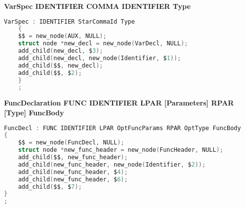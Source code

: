 \documentclass[12pt]{article}
\begin{document}
\begin{itemize}
\begin{center}
                \end{center}
            \begin{center}
                \small\textbf{VarSpec \textendash{} IDENTIFIER {COMMA IDENTIFIER} Type}
            \end{center}
            \begin{center}
                \begin{lstlisting}[language=C, basicstyle=\small\ttfamily]
VarSpec : IDENTIFIER StarCommaId Type
    {
    $$ = new_node(AUX, NULL);
    struct node *new_decl = new_node(VarDecl, NULL);
    add_child(new_decl, $3);
    add_child(new_decl, new_node(Identifier, $1));
    add_child($$, new_decl);
    add_child($$, $2);
    }
    ;
            \end{lstlisting}
        \end{center}
        \begin{center}
        \small\textbf{FuncDeclaration \textendash{} FUNC IDENTIFIER LPAR [Parameters] RPAR [Type] FuncBody}
        \end{center}
        \begin{center}
        \begin{lstlisting}[language=C, basicstyle=\small\ttfamily]
FuncDecl : FUNC IDENTIFIER LPAR OptFuncParams RPAR OptType FuncBody
{
    $$ = new_node(FuncDecl, NULL);
    struct node *new_func_header = new_node(FuncHeader, NULL);
    add_child($$, new_func_header);
    add_child(new_func_header, new_node(Identifier, $2));
    add_child(new_func_header, $4);
    add_child(new_func_header, $6);
    add_child($$, $7);
}
;
    \end{lstlisting}
    \end{center}
    \end{itemize}
\end{document}
